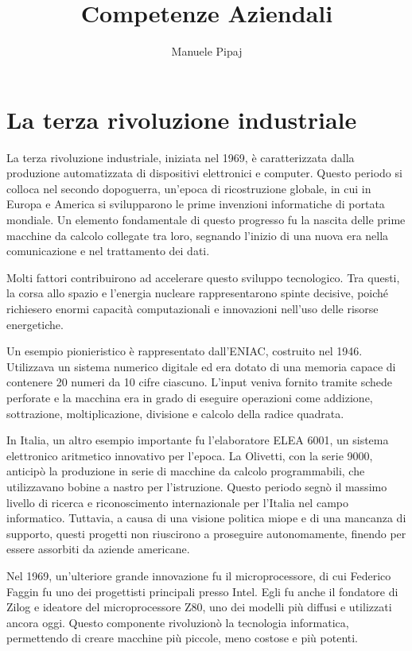 \documentclass[12pt]{article}
\title{Competenze Aziendali}
\author{Manuele Pipaj}
\date{}
\begin{document}
\maketitle

\section{La terza rivoluzione industriale}
La terza rivoluzione industriale, iniziata nel 1969, è caratterizzata dalla produzione automatizzata di dispositivi elettronici e computer. Questo periodo si colloca nel secondo dopoguerra, un’epoca di ricostruzione globale, in cui in Europa e America si svilupparono le prime invenzioni informatiche di portata mondiale. Un elemento fondamentale di questo progresso fu la nascita delle prime macchine da calcolo collegate tra loro, segnando l’inizio di una nuova era nella comunicazione e nel trattamento dei dati.

Molti fattori contribuirono ad accelerare questo sviluppo tecnologico. Tra questi, la corsa allo spazio e l’energia nucleare rappresentarono spinte decisive, poiché richiesero enormi capacità computazionali e innovazioni nell’uso delle risorse energetiche.

Un esempio pionieristico è rappresentato dall’ENIAC, costruito nel 1946. Utilizzava un sistema numerico digitale ed era dotato di una memoria capace di contenere 20 numeri da 10 cifre ciascuno. L’input veniva fornito tramite schede perforate e la macchina era in grado di eseguire operazioni come addizione, sottrazione, moltiplicazione, divisione e calcolo della radice quadrata.

In Italia, un altro esempio importante fu l’elaboratore ELEA 6001, un sistema elettronico aritmetico innovativo per l’epoca. La Olivetti, con la serie 9000, anticipò la produzione in serie di macchine da calcolo programmabili, che utilizzavano bobine a nastro per l’istruzione. Questo periodo segnò il massimo livello di ricerca e riconoscimento internazionale per l’Italia nel campo informatico. Tuttavia, a causa di una visione politica miope e di una mancanza di supporto, questi progetti non riuscirono a proseguire autonomamente, finendo per essere assorbiti da aziende americane.

Nel 1969, un’ulteriore grande innovazione fu il microprocessore, di cui Federico Faggin fu uno dei progettisti principali presso Intel. Egli fu anche il fondatore di Zilog e ideatore del microprocessore Z80, uno dei modelli più diffusi e utilizzati ancora oggi. Questo componente rivoluzionò la tecnologia informatica, permettendo di creare macchine più piccole, meno costose e più potenti.
\end{document}
